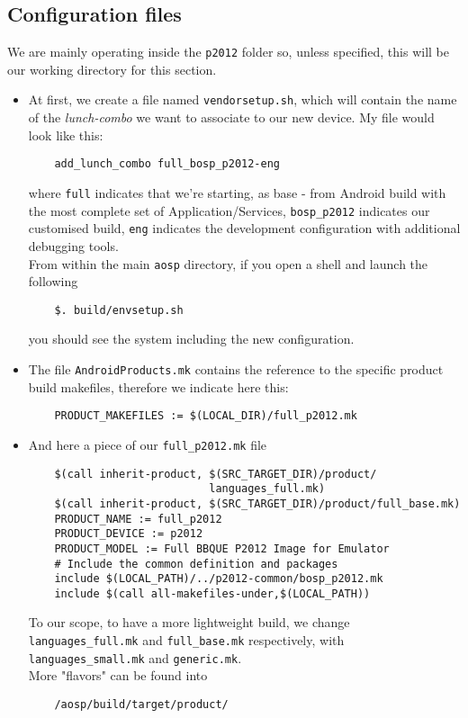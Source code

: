 \subsection{Configuration files}
We are mainly operating inside the \texttt{p2012} folder so, unless specified, this will be our working directory for this section.
\begin{itemize}
\item At first, we create a file named \texttt{vendorsetup.sh}, which will contain the name of the \textit{lunch-combo} we want to associate to our new device. My file would look like this:
\begin{verbatim}
	add_lunch_combo full_bosp_p2012-eng
\end{verbatim}
where \texttt{full} indicates that we're starting, as base - from Android build with the most complete set of Application/Services, \texttt{bosp\_p2012} indicates our customised build, \texttt{eng} indicates the development configuration with additional debugging tools.\\
From within the main \texttt{aosp} directory, if you open a shell and launch the following
\begin{verbatim}
	$. build/envsetup.sh
\end{verbatim}
you should see the system including the new configuration.
\item The file \texttt{AndroidProducts.mk} contains the reference to the specific product build makefiles, therefore we indicate here this:
\begin{verbatim}
	PRODUCT_MAKEFILES := $(LOCAL_DIR)/full_p2012.mk
\end{verbatim}
\item And here a piece of our \texttt{full\_p2012.mk} file
\begin{verbatim}
	$(call inherit-product, $(SRC_TARGET_DIR)/product/
	                        languages_full.mk)
	$(call inherit-product, $(SRC_TARGET_DIR)/product/full_base.mk)
	PRODUCT_NAME := full_p2012
	PRODUCT_DEVICE := p2012
	PRODUCT_MODEL := Full BBQUE P2012 Image for Emulator
	# Include the common definition and packages
	include $(LOCAL_PATH)/../p2012-common/bosp_p2012.mk
	include $(call all-makefiles-under,$(LOCAL_PATH))
\end{verbatim}
To our scope, to have a more lightweight build, we change \texttt{languages\_full.mk} and \texttt{full\_base.mk} respectively, with \texttt{languages\_small.mk} and \texttt{generic.mk}.\\
More "flavors" can be found into
\begin{verbatim}
	/aosp/build/target/product/
\end{verbatim}

\end{itemize}